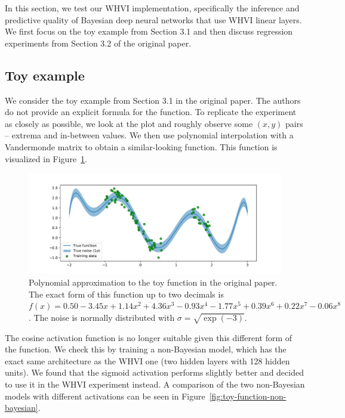 In this section, we test our WHVI implementation, specifically the inference and predictive quality of Bayesian deep neural networks that use WHVI linear layers.
We first focus on the toy example from Section 3.1 and then discuss regression experiments from Section 3.2 of the original paper.

\subsection{Toy example}\label{subsec:toy-example}
We consider the toy example from Section 3.1 in the original paper.
The authors do not provide an explicit formula for the function.
To replicate the experiment as closely as possible, we look at the plot and roughly observe some $(x, y)$ pairs -- extrema and in-between values.
We then use polynomial interpolation with a Vandermonde matrix to obtain a similar-looking function.
This function is visualized in Figure~\ref{fig:toy-function}.

\begin{figure}[h]
    \centering
    \includegraphics[width=1.0\hsize]{img/toy-function}
    \caption{Polynomial approximation to the toy function in the original paper.
    The exact form of this function up to two decimals is $f(x) = 0.50 -3.45x + 1.14x^2 + 4.36x^3 -0.93x^4 -1.77x^5 + 0.39x^6 + 0.22x^7 -0.06x^8$.
    The noise is normally distributed with $\sigma = \sqrt{\exp (-3)}$.
    }
    \label{fig:toy-function}
\end{figure}

The cosine activation function is no longer suitable given this different form of the function.
We check this by training a non-Bayesian model, which has the exact same architecture as the WHVI one (two hidden layers with 128 hidden units).
We found that the sigmoid activation performs slightly better and decided to use it in the WHVI experiment instead.
A comparison of the two non-Bayesian models with different activations can be seen in Figure~\ref{fig:toy-function-non-bayesian}.

